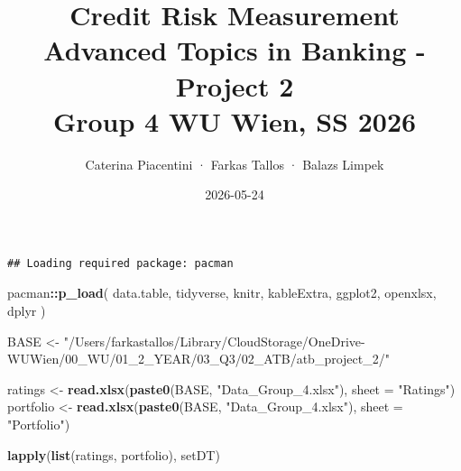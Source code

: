 \documentclass[
  11pt,
]{article}
\title{Credit Risk Measurement\\
Advanced Topics in Banking - Project 2\\
Group 4 \textbar{} WU Wien, SS 2026}
\author{Caterina Piacentini · Farkas Tallos · Balazs Limpek}
\date{2026-05-24}
\newenvironment{Shaded}{\begin{snugshade}}{\end{snugshade}}
\newcommand{\AttributeTok}[1]{\textcolor[rgb]{0.13,0.29,0.53}{#1}}
\newcommand{\ConstantTok}[1]{\textcolor[rgb]{0.56,0.35,0.01}{#1}}
\newcommand{\ControlFlowTok}[1]{\textcolor[rgb]{0.13,0.29,0.53}{\textbf{#1}}}
\newcommand{\DecValTok}[1]{\textcolor[rgb]{0.00,0.00,0.81}{#1}}
\newcommand{\FunctionTok}[1]{\textcolor[rgb]{0.13,0.29,0.53}{\textbf{#1}}}
\newcommand{\NormalTok}[1]{#1}
\newcommand{\OtherTok}[1]{\textcolor[rgb]{0.56,0.35,0.01}{#1}}
\newcommand{\SpecialCharTok}[1]{\textcolor[rgb]{0.81,0.36,0.00}{\textbf{#1}}}
\newcommand{\StringTok}[1]{\textcolor[rgb]{0.31,0.60,0.02}{#1}}
\begin{document}
\maketitle

{
\setcounter{tocdepth}{3}
\tableofcontents
}
\begin{Shaded}
\end{Shaded}

\begin{verbatim}
## Loading required package: pacman
\end{verbatim}

\begin{Shaded}
\begin{Highlighting}[]
\NormalTok{pacman}\SpecialCharTok{::}\FunctionTok{p\_load}\NormalTok{(}
\NormalTok{    data.table,}
\NormalTok{    tidyverse,}
\NormalTok{    knitr,}
\NormalTok{    kableExtra,}
\NormalTok{    ggplot2,}
\NormalTok{    openxlsx,}
\NormalTok{    dplyr}
\NormalTok{)}

\NormalTok{BASE }\OtherTok{\textless{}{-}} \StringTok{"/Users/farkastallos/Library/CloudStorage/OneDrive{-}WUWien/00\_WU/01\_2\_YEAR/03\_Q3/02\_ATB/atb\_project\_2/"}


\NormalTok{ratings }\OtherTok{\textless{}{-}} \FunctionTok{read.xlsx}\NormalTok{(}\FunctionTok{paste0}\NormalTok{(BASE, }\StringTok{"Data\_Group\_4.xlsx"}\NormalTok{), }\AttributeTok{sheet =} \StringTok{"Ratings"}\NormalTok{)}
\NormalTok{portfolio }\OtherTok{\textless{}{-}} \FunctionTok{read.xlsx}\NormalTok{(}\FunctionTok{paste0}\NormalTok{(BASE, }\StringTok{"Data\_Group\_4.xlsx"}\NormalTok{), }\AttributeTok{sheet =} \StringTok{"Portfolio"}\NormalTok{)}


\FunctionTok{lapply}\NormalTok{(}\FunctionTok{list}\NormalTok{(ratings, portfolio), setDT)}
\end{Highlighting}
\end{Shaded}
\end{document}
